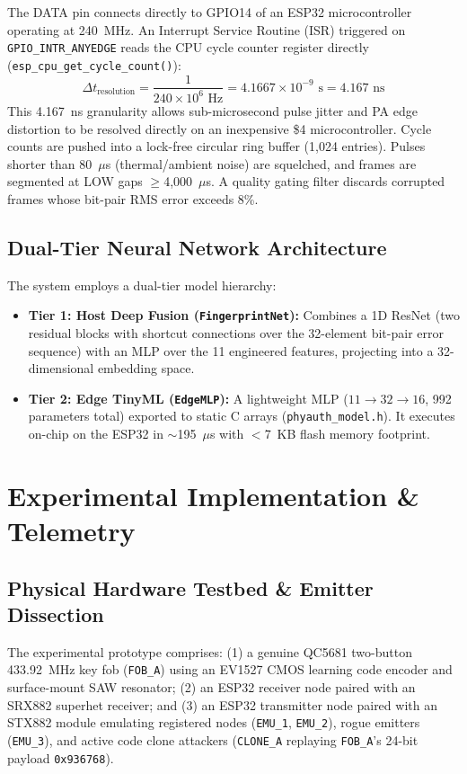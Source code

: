 \documentclass[11pt,a4paper]{article}
\begin{document}
The DATA pin connects directly to GPIO14 of an ESP32 microcontroller operating at 240~MHz. An Interrupt Service Routine (ISR) triggered on \texttt{GPIO\_INTR\_ANYEDGE} reads the CPU cycle counter register directly (\texttt{esp\_cpu\_get\_cycle\_count()}):
\begin{equation}
\Delta t_{\text{resolution}} = \frac{1}{240 \times 10^6\text{ Hz}} = 4.1667 \times 10^{-9}\text{ s} = 4.167\text{ ns}
\end{equation}
This 4.167~ns granularity allows sub-microsecond pulse jitter and PA edge distortion to be resolved directly on an inexpensive \$4 microcontroller. Cycle counts are pushed into a lock-free circular ring buffer (1,024 entries). Pulses shorter than 80~$\mu$s (thermal/ambient noise) are squelched, and frames are segmented at LOW gaps $\ge$4,000~$\mu$s. A quality gating filter discards corrupted frames whose bit-pair RMS error exceeds 8\%.

\subsection{Dual-Tier Neural Network Architecture}
The system employs a dual-tier model hierarchy:
\begin{itemize}\setlength\itemsep{0.1em}
    \item \textbf{Tier 1: Host Deep Fusion (\texttt{FingerprintNet}):} Combines a 1D ResNet (two residual blocks with shortcut connections over the 32-element bit-pair error sequence) with an MLP over the 11 engineered features, projecting into a 32-dimensional embedding space.
    \item \textbf{Tier 2: Edge TinyML (\texttt{EdgeMLP}):} A lightweight MLP ($11 \to 32 \to 16$, 992 parameters total) exported to static C arrays (\texttt{phyauth\_model.h}). It executes on-chip on the ESP32 in $\sim$195~$\mu$s with $<$7~KB flash memory footprint.
\end{itemize}

\section{Experimental Implementation \& Telemetry}
\subsection{Physical Hardware Testbed \& Emitter Dissection}
The experimental prototype comprises: (1) a genuine QC5681 two-button 433.92~MHz key fob (\texttt{FOB\_A}) using an EV1527 CMOS learning code encoder and surface-mount SAW resonator; (2) an ESP32 receiver node paired with an SRX882 superhet receiver; and (3) an ESP32 transmitter node paired with an STX882 module emulating registered nodes (\texttt{EMU\_1}, \texttt{EMU\_2}), rogue emitters (\texttt{EMU\_3}), and active code clone attackers (\texttt{CLONE\_A} replaying \texttt{FOB\_A}'s 24-bit payload \texttt{0x936768}).
\end{document}
